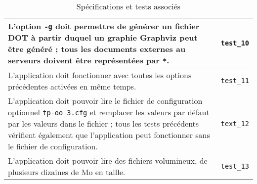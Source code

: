 \documentclass[11pt,a4paper]{article}
\begin{document}
\begin{center}
\begin{table}[!h]
\begin{tabularx}{\textwidth}{ | X | p{1.5cm} | }
            L'option \texttt{-g} doit permettre de générer un fichier DOT à partir duquel un graphie Graphviz peut être généré ; tous les documents externes au serveurs doivent être représentées par \texttt{*}. & \texttt{test\_10} \\ \hline
            L'application doit fonctionner avec toutes les options précédentes activées en même temps. & \texttt{test\_11} \\ \hline
            L'application doit pouvoir lire le fichier de configuration optionnel \texttt{tp-oo\_3.cfg} et remplacer les valeurs par défaut par les valeurs dans le fichier ; tous les tests précédents vérifient également que l'application peut fonctionner sans le fichier de configuration. & \texttt{text\_12} \\ \hline
            L'application doit pouvoir lire des fichiers volumineux, de plusieurs dizaines de Mo en taille. & \texttt{test\_13} \\ \hline
    	\end{tabularx}
        \caption{Spécifications et tests associés}
        \label{tab:specifications}
    \end{table}
\end{center}
\end{document}
